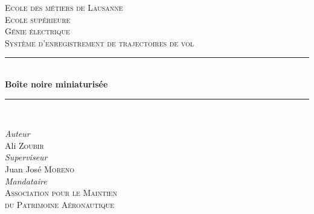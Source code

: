 \begin{titlepage} %
	\newcommand{\HRule}{\rule{\linewidth}{0.5mm}} %
	
	\center %
	
	
	\textsc{\LARGE Ecole des métiers de Lausanne \\ Ecole supérieure}\\[1.5cm] %
	
	\textsc{\Large Génie électrique}\\[0.5cm] %
	
	\textsc{\large Système d'enregistrement de trajectoires de vol}\\[0.5cm] %
	
	\vspace{+25mm}
	
	\HRule\\[0.4cm]
	
	{\huge\bfseries Boîte noire miniaturisée}\\[0.4cm] %
	
	\HRule\\[1.5cm]
	
	\vspace{+10mm}
	

	\begin{center}
		\large
		\textit{Auteur}\\
		Ali \textsc{Zoubir} \vspace{+5mm}\\ 
		\large
		\textit{Superviseur} \\
		Juan José \textsc{Moreno} \vspace{+5mm}\\
		\large
		\textit{Mandataire}\\
		\textsc{Association pour le Maintien \\ du Patrimoine Aéronautique}
	\end{center}


\end{titlepage}
